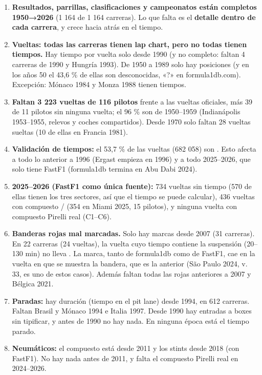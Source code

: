 \begin{enumerate}
\item \textbf{Resultados, parrillas, clasificaciones y campeonatos están completos 1950→2026} (1 164 de 1 164 carreras). Lo que falta es el \textbf{detalle dentro de cada carrera}, y crece hacia atrás en el tiempo.
\item \textbf{Vueltas: todas las carreras tienen lap chart, pero no todas tienen tiempos.} Hay tiempo por vuelta solo desde 1990 (y no completo: faltan 4 carreras de 1990 y Hungría 1993). De 1950 a 1989 solo hay posiciones (y en los años 50 el 43,6 \% de ellas son desconocidas, «?» en formula1db.com). Excepción: Mónaco 1984 y Monza 1988 tienen tiempos.
\item \textbf{Faltan 3 223 vueltas de 116 pilotos} frente a las vueltas oficiales, más 39 de 11 pilotos sin ninguna vuelta; el 96 \% son de 1950–1959 (Indianápolis 1953–1955, relevos y coches compartidos). Desde 1970 solo faltan 28 vueltas sueltas (10 de ellas en Francia 1981).
\item \textbf{Validación de tiempos:} el 53,7 \% de las vueltas (682 058) son . Esto afecta a todo lo anterior a 1996 (Ergast empieza en 1996) y a todo 2025–2026, que solo tiene FastF1 (formula1db termina en Abu Dabi 2024).
\item \textbf{2025–2026 (FastF1 como única fuente):} 734 vueltas sin tiempo (570 de ellas tienen los tres sectores, así que el tiempo se puede calcular), 436 vueltas con compuesto / (354 en Miami 2025, 15 pilotos), y ninguna vuelta con compuesto Pirelli real (C1–C6).
\item \textbf{Banderas rojas mal marcadas.} Solo hay marcas desde 2007 (31 carreras). En 22 carreras (24 vueltas), la vuelta cuyo tiempo contiene la suspensión (20–130 min) no lleva . La marca, tanto de formula1db como de FastF1, cae en la vuelta en que se muestra la bandera, que es la anterior (São Paulo 2024, v. 33, es uno de estos casos). Además faltan todas las rojas anteriores a 2007 y Bélgica 2021.
\item \textbf{Paradas:} hay duración (tiempo en el pit lane) desde 1994, en 612 carreras. Faltan Brasil y Mónaco 1994 e Italia 1997. Desde 1990 hay entradas a boxes sin tipificar, y antes de 1990 no hay nada. En ninguna época está el tiempo parado.
\item \textbf{Neumáticos:} el compuesto está desde 2011 y los stints desde 2018 (con FastF1). No hay nada antes de 2011, y falta el compuesto Pirelli real en 2024–2026.

\end{enumerate}
